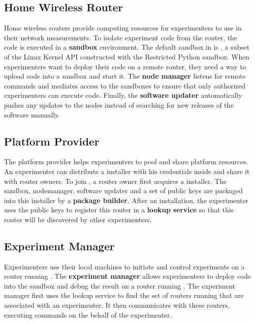 \subsection{Home Wireless Router}
Home wireless routers provide computing resources for experimenters to use in their network measurements. To isolate experiment code from the router, the code is executed in a \textbf{sandbox} environment. The default sandbox in \sysname is \sandboxname, a subset of the Linux Kernel API constructed with the Restricted Python sandbox. When experimenters want to deploy their code on a remote router, they need a way to upload code into a sandbox and start it. The \textbf{node manager} listens for remote commands and mediates access to the sandboxes to ensure that only authorized experimenters can execute code. Finally, the \textbf{software updater} automatically pushes any updates to the nodes instead of searching for new releases of the software manually.  

\subsection{Platform Provider}
The platform provider helps experimenters to pool and share platform resources. An experimenter can distribute a \sysname installer with his credentials inside and share it with router owners. To join \sysname, a router owner first acquires a \sysname installer. The sandbox, nodemanager, software updater and a set of public keys are packaged into this installer by a \textbf{package builder}. After an installation, the experimenter uses the public keys to register this router in a \textbf{lookup service} so that this router will be discovered by other experimenters.

\subsection{Experiment Manager}
Experimenters use their local machines to initiate and control experiments on a router running \sysname. The \textbf{experiment manager} allows experimenters to deploy code into the sandbox and debug the result on a router running \sysname. The experiment manager first uses the lookup service to find the set of routers running \sysname that are associated with an experimenter. It then communicates with these routers, executing commands on the behalf of the experimenter.  

